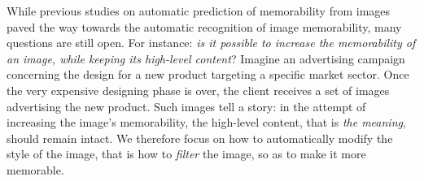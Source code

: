\documentclass{sig-alternate-05-2015}
\begin{document}
While previous studies on automatic prediction of memorability from images paved the way towards the automatic recognition of image memorability, many questions are still open. For instance: \textit{is it possible to increase the memorability of an image, while keeping its high-level content}? Imagine an advertising campaign concerning the design for a new product targeting a specific market sector. Once the very expensive designing phase is over, the client receives a set of images advertising the new product. Such images tell a story: in the attempt of increasing the image's memorability, the high-level content, that is \textit{the meaning}, should remain intact. We therefore focus on how to automatically modify the style of the image, that is how to \textit{filter} the image, so as to make it more memorable.
\end{document}
